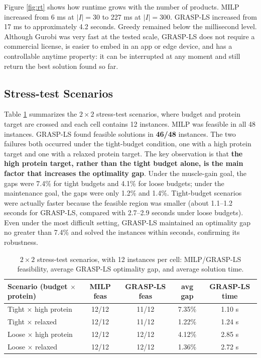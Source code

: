 \documentclass[a4paper]{article}
\begin{document}
Figure \ref{fig:rt} shows how runtime grows with the number of products. MILP increased from 6 ms at $|I|=30$ to 227 ms at $|I|=300$. GRASP-LS increased from 17 ms to approximately 4.2 seconds. Greedy remained below the millisecond level. Although Gurobi was very fast at the tested scale, GRASP-LS does not require a commercial license, is easier to embed in an app or edge device, and has a controllable anytime property: it can be interrupted at any moment and still return the best solution found so far.

\subsection{Stress-test Scenarios}\label{sec:stress}
Table \ref{tab:stress} summarizes the $2\times2$ stress-test scenarios, where budget and protein target are crossed and each cell contains 12 instances. MILP was feasible in all 48 instances. GRASP-LS found feasible solutions in \textbf{46/48} instances. The two failures both occurred under the tight-budget condition, one with a high protein target and one with a relaxed protein target. The key observation is that \textbf{the high protein target, rather than the tight budget alone, is the main factor that increases the optimality gap}. Under the muscle-gain goal, the gaps were 7.4\% for tight budgets and 4.1\% for loose budgets; under the maintenance goal, the gaps were only 1.2\% and 1.4\%. Tight-budget scenarios were actually faster because the feasible region was smaller (about 1.1--1.2 seconds for GRASP-LS, compared with 2.7--2.9 seconds under loose budgets). Even under the most difficult setting, GRASP-LS maintained an optimality gap no greater than 7.4\% and solved the instances within seconds, confirming its robustness.
\begin{table}[h]
\centering\normalsize
\caption{$2\times2$ stress-test scenarios, with 12 instances per cell: MILP/GRASP-LS feasibility, average GRASP-LS optimality gap, and average solution time.}
\label{tab:stress}
\begin{tabular}{lcccc}
\toprule
Scenario (budget $\times$ protein) & MILP feas & GRASP-LS feas & avg gap & GRASP-LS time \\
\midrule
Tight $\times$ high protein & 12/12 & 11/12 & 7.35\% & 1.10 s \\
Tight $\times$ relaxed      & 12/12 & 11/12 & 1.22\% & 1.24 s \\
Loose $\times$ high protein & 12/12 & 12/12 & 4.12\% & 2.85 s \\
Loose $\times$ relaxed      & 12/12 & 12/12 & 1.36\% & 2.72 s \\
\bottomrule
\end{tabular}
\end{table}
\end{document}
